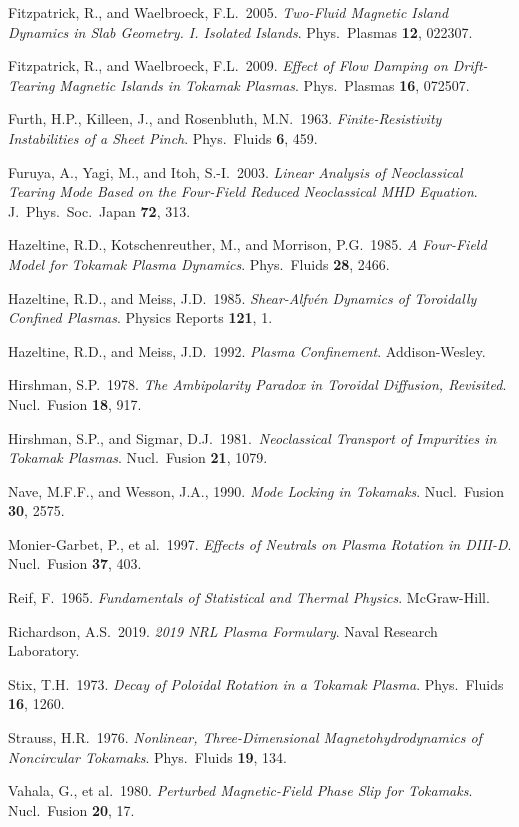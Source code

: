 \documentclass[notitlepage,12pt]{article}
\begin{document}
\begin{description}
\item Fitzpatrick, R., and Waelbroeck, F.L.\ 2005. {\em Two-Fluid Magnetic Island Dynamics in Slab Geometry. I. Isolated Islands}.
Phys.\ Plasmas {\bf 12}, 022307. 
\item Fitzpatrick, R., and Waelbroeck, F.L.\ 2009. {\em Effect of Flow Damping on Drift-Tearing Magnetic Islands in Tokamak Plasmas}.
Phys.\ Plasmas {\bf 16}, 072507.
\item Furth, H.P., Killeen, J., and Rosenbluth, M.N.\ 1963. {\em Finite-Resistivity Instabilities of a Sheet Pinch}. Phys.\ Fluids {\bf 6}, 459.
\item Furuya, A., Yagi, M., and Itoh, S.-I.\ 2003. {\em Linear Analysis of Neoclassical Tearing Mode
Based on the Four-Field Reduced Neoclassical MHD Equation}. J.\ Phys.\ Soc.\ Japan {\bf 72}, 313.
\item Hazeltine, R.D., Kotschenreuther, M., and Morrison, P.G.\ 1985. {\em A Four-Field Model for Tokamak Plasma Dynamics}.
 Phys.\ Fluids {\bf 28}, 2466.
\item Hazeltine, R.D., and Meiss, J.D.\ 1985. {\em Shear-Alfv\'{e}n Dynamics of Toroidally Confined Plasmas}. Physics Reports {\bf 121}, 1.
\item Hazeltine, R.D., and Meiss, J.D.\ 1992. {\em Plasma Confinement}. Addison-Wesley. 
\item Hirshman, S.P.\ 1978. {\em The Ambipolarity Paradox in Toroidal Diffusion, Revisited}. Nucl.\ Fusion {\bf 18}, 917.
\item Hirshman, S.P., and Sigmar, D.J.\ 1981.\ {\em Neoclassical Transport of Impurities in Tokamak Plasmas}. Nucl.\ Fusion {\bf 21}, 1079.
\item Nave, M.F.F., and Wesson, J.A., 1990. {\em Mode Locking in Tokamaks}. Nucl.\ Fusion {\bf 30}, 2575. 
\item Monier-Garbet, P., et al.\ 1997. {\em Effects of Neutrals on Plasma Rotation in DIII-D}. Nucl.\ Fusion {\bf 37}, 403.
\item Reif, F.\ 1965. {\em Fundamentals of Statistical and Thermal Physics}. McGraw-Hill.
\item Richardson, A.S.\ 2019. {\em 2019 NRL Plasma Formulary}.  Naval Research Laboratory.
\item Stix, T.H.\ 1973. {\em Decay of Poloidal Rotation in a Tokamak Plasma}. Phys.\ Fluids {\bf 16}, 1260.
\item Strauss, H.R.\ 1976. {\em Nonlinear, Three-Dimensional Magnetohydrodynamics of  Noncircular Tokamaks}. Phys.\ Fluids {\bf 19},  134.
\item Vahala, G., et al.\ 1980. {\em Perturbed Magnetic-Field Phase Slip for Tokamaks}. Nucl.\ Fusion {\bf 20}, 17.

\end{description}
\end{document}
